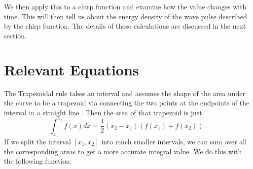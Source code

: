 \documentclass[aps,prl,twocolumn,superscriptaddress]{revtex4-1}
\newcommand{\paren}[1]{\left( #1 \right)} 	%
\begin{document}
We then apply this to a chirp function and examine how the value changes with time. This will then tell us about the energy density of the wave pulse described by the chirp function. The details of these calculations are discussed in the next section.

\section{Relevant Equations}
The Trapezoidal rule takes an interval and assumes the shape of the area under the curve to be a trapezoid via connecting the two points at the endpoints of the interval in a straight line \cite{trap}. Then the area of that trapezoid is just
\begin{equation}
\int_{x_1}^{x_2} f(x) dx = \frac{1}{2} \paren{x_2 - x_1} \paren{f(x_1) + f(x_2)} ~. \label{eqn:trap}
\end{equation}
If we split the interval $[x_1, x_2]$ into much smaller intervals, we can sum over all the corresponding areas to get a more accurate integral value. We do this with the following function:
\end{document}
